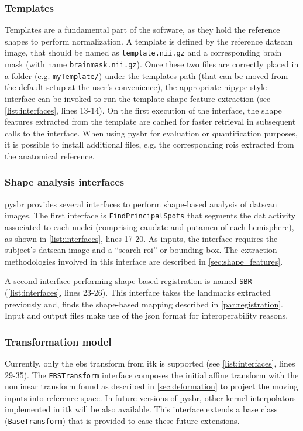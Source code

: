 \documentclass{frontiers}
\begin{document}
\subsubsection{Templates}
\label{supl:templates}
Templates are a fundamental part of the software, as they hold the reference shapes to
  perform normalization.
A template is defined by the reference \gls*{datscan} image, that
  should be named as \texttt{template.nii.gz} and a corresponding brain mask (with name
  \texttt{brainmask.nii.gz}).
Once these two files are correctly placed in a folder
  (e.g. \texttt{myTemplate/}) under the templates path (that can be moved from the
  default setup at the user's convenience), the appropriate \gls*{nipype}-style
  interface can be invoked to run the template shape feature extraction (see
  \autoref{list:interfaces}, lines 13-14).
On the first execution of the interface, the shape features extracted from
  the template are cached for faster retrieval in subsequent calls to the interface. 
When using \gls*{pysbr} for evaluation or quantification purposes, it is possible
  to install additional files, e.g. the corresponding \glspl*{roi} extracted
  from the anatomical reference.


\subsubsection{Shape analysis interfaces}
\label{supl:shapeanalysis}

\Gls*{pysbr} provides several interfaces to perform shape-based analysis of \gls*{datscan}
  images.
The first interface is \texttt{FindPrincipalSpots} that segments the \acrlong*{dat} activity
  associated to each nuclei (comprising caudate and putamen of each hemisphere),
  as shown in \autoref{list:interfaces}, lines 17-20.
As inputs, the interface requires the subject's \gls*{datscan} image and a ``search-\gls*{roi}'' or
  bounding box.
The extraction methodologies involved in this interface are described in \autoref{sec:shape_features}.

A second interface performing shape-based registration is named \texttt{SBR}
  (\autoref{list:interfaces}, lines 23-26).
This interface takes the landmarks extracted previously and, finds
  the shape-based mapping described in \autoref{par:registration}.
Input and output files make use of the \gls*{json} format
  for interoperability reasons.

\subsubsection{Transformation model} %
Currently, only the \gls*{ebs} transform from \gls*{itk} is supported
  (see \autoref{list:interfaces}, lines 29-35).
The \texttt{EBSTransform} interface composes the initial affine transform
  with the nonlinear transform found as described in \autoref{sec:deformation}
  to project the moving inputs into reference space.
In future versions of \gls*{pysbr}, other kernel interpolators implemented in \gls*{itk} 
  will be also available.
This interface extends a base class (\texttt{BaseTransform}) that is provided to
  ease these future extensions.
\end{document}
